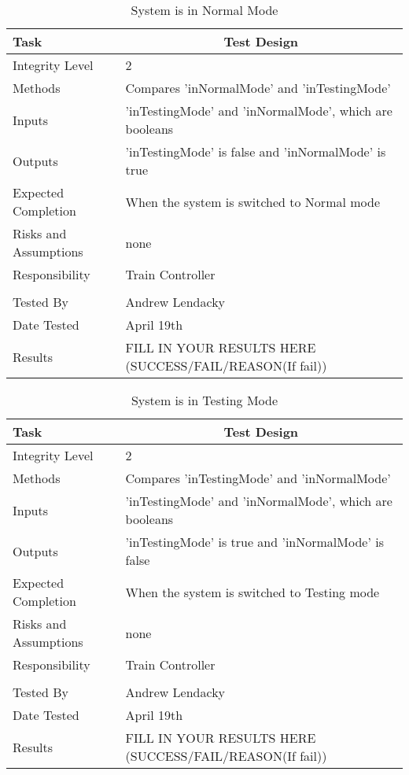\documentclass[]{article}
\begin{document}
\begin{table}[H]
	\centering
	\caption{System is in Normal Mode}
	\begin{tabular}{|l|l|}
		\hline
		Task & \multicolumn{1}{c|}{Test Design} \\ \hline
		Integrity Level & 2\\ \hline
		Methods & Compares 'inNormalMode' and 'inTestingMode'\\ \hline
		Inputs & 'inTestingMode' and 'inNormalMode', which are booleans\\ \hline
		Outputs & 'inTestingMode' is false and 'inNormalMode' is true \\ \hline
		Expected Completion & When the system is switched to Normal mode\\ \hline
		Risks and Assumptions & none\\ \hline
		Responsibility & Train Controller\\ \hline
			\\ \hline
		Tested By   &  Andrew Lendacky\\	\hline
		Date Tested & \parbox[t]{10cm}{April 19th}\\ \hline
		Results & FILL IN YOUR RESULTS HERE (SUCCESS/FAIL/REASON(If fail))\\ \hline
	\end{tabular}
\end{table}

\begin{table}[H]
	\centering
	\caption{System is in Testing Mode}
	\begin{tabular}{|l|l|}
		\hline
		Task & \multicolumn{1}{c|}{Test Design} \\ \hline
		Integrity Level & 2 \\ \hline
		Methods & Compares 'inTestingMode' and 'inNormalMode'\\ \hline
		Inputs & 'inTestingMode' and 'inNormalMode', which are booleans\\ \hline
		Outputs & 'inTestingMode' is true and 'inNormalMode'  is false\\ \hline
		Expected Completion & When the system is switched to Testing mode\\ \hline
		Risks and Assumptions & none\\ \hline
		Responsibility & Train Controller\\ \hline
			\\ \hline
		Tested By   &  Andrew Lendacky\\	\hline
		Date Tested & \parbox[t]{10cm}{April 19th}\\ \hline
		Results & FILL IN YOUR RESULTS HERE (SUCCESS/FAIL/REASON(If fail))\\ \hline
	\end{tabular}
\end{table}
\end{document}

